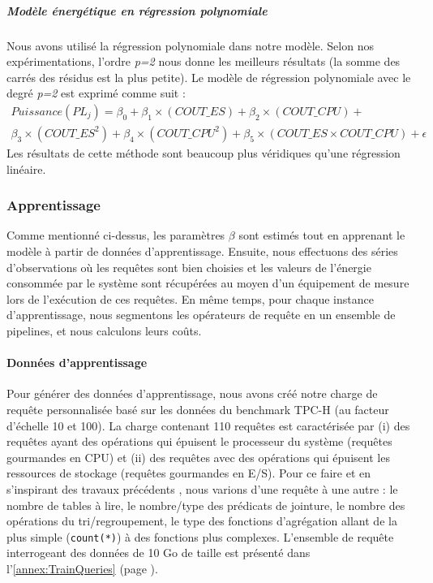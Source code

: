 \subparagraph{Modèle énergétique en régression polynomiale}
Nous avons utilisé la régression polynomiale dans notre modèle. Selon nos expérimentations, l'ordre \textit{p=2} nous donne les meilleurs résultats (la somme des carrés des résidus est la plus petite). Le modèle de régression polynomiale avec le degré \textit{p=2} est exprimé comme suit :
\begin{equation} \label{eq:poly-reg-equation}
\begin{aligned}
  Puissance(PL_j) = \beta_{0} + \beta_{1} \times (COUT\_ES) + \beta_{2} \times (COUT\_CPU) + \\
  \beta_{3} \times (COUT\_ES^2) + \beta_{4} \times (COUT\_CPU^2) + \beta_{5} \times (COUT\_ES \times COUT\_CPU) + \epsilon
\end{aligned}
\end{equation}
Les résultats de cette méthode sont beaucoup plus véridiques qu'une régression linéaire.

\subsubsection{Apprentissage}
Comme mentionné ci-dessus, les paramètres $\beta$ sont estimés tout en apprenant le modèle à partir de données d'apprentissage.
Ensuite, nous effectuons des séries d'observations où les requêtes sont bien choisies et les valeurs de l'énergie consommée par le système sont récupérées au moyen  d'un équipement de mesure lors de l'exécution de ces requêtes. En même temps, pour chaque instance d'apprentissage, nous segmentons les opérateurs de requête en un ensemble de pipelines, et nous calculons leurs coûts.

\paragraph{Données d'apprentissage}
Pour générer des données d'apprentissage, nous avons créé notre charge de requête personnalisée basé sur les données du benchmark TPC-H (au facteur d'échelle 10 et 100). La charge contenant 110 requêtes est caractérisée par (i) des requêtes ayant des opérations qui épuisent le processeur du système (requêtes gourmandes en CPU) et (ii) des requêtes avec des opérations qui épuisent les ressources de stockage (requêtes gourmandes en E/S). Pour ce faire et en s'inspirant des travaux précédents \cite{Kunjir12}, nous varions d'une requête à une autre : le nombre de tables à lire, le nombre/type des prédicats de jointure, le nombre des opérations du tri/regroupement, le type des fonctions d'agrégation allant de la plus simple (\texttt{count(*)}) à des fonctions plus complexes. L'ensemble de requête interrogeant des données de 10 Go de taille est présenté dans l'\ref{annex:TrainQueries} (page \pageref{annex:TrainQueries}).

